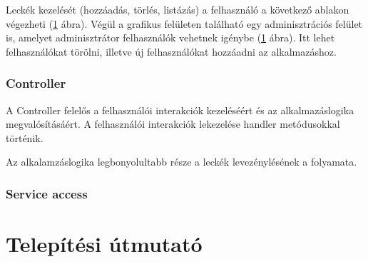 \documentclass[11pt, a4paper]{article}
\begin{document}
     Leckék kezelését (hozzáadás, törlés, listázás) a felhasználó a következő ablakon végezheti (\ref{} ábra).
     Végül a grafikus felületen található egy adminisztrációs felület is, amelyet adminisztrátor felhasználók vehetnek igénybe (\ref{} ábra). Itt lehet felhasználókat törölni, illetve új felhasználókat hozzáadni az alkalmazáshoz.
   
     \subsubsection{Controller}
     A Controller felelős a felhasználói interakciók kezeléséért és az alkalmazáslogika megvalósításáért. A felhasználói interakciók lekezelése handler metódusokkal történik.
     
     Az alkalamzáslogika legbonyolultabb része a leckék levezénylésének a folyamata.
     \subsubsection{Service access}
     
    \section{Telepítési útmutató}
    
    
\end{document}
